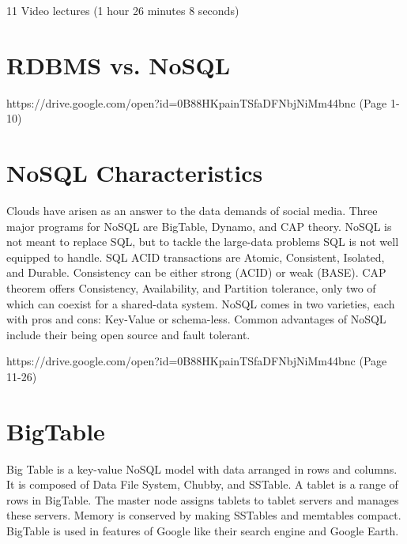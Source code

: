 
  11 Video lectures (1 hour 26 minutes 8 seconds)

\section{RDBMS vs. NoSQL}


{https://drive.google.com/open?id=0B88HKpainTSfaDFNbjNiMm44bnc
  (Page 1-10)}

\section{NoSQL Characteristics}

Clouds have arisen as an answer to the data demands of social media.
Three major programs for NoSQL are BigTable, Dynamo, and CAP theory.
NoSQL is not meant to replace SQL, but to tackle the large-data problems
SQL is not well equipped to handle. SQL ACID transactions are Atomic,
Consistent, Isolated, and Durable. Consistency can be either strong
(ACID) or weak (BASE). CAP theorem offers Consistency, Availability, and
Partition tolerance, only two of which can coexist for a shared-data
system. NoSQL comes in two varieties, each with pros and cons: Key-Value
or schema-less. Common advantages of NoSQL include their being open
source and fault tolerant.


{https://drive.google.com/open?id=0B88HKpainTSfaDFNbjNiMm44bnc
  (Page 11-26)}

\section{BigTable}

Big Table is a key-value NoSQL model with data arranged in rows and
columns. It is composed of Data File System, Chubby, and SSTable. A
tablet is a range of rows in BigTable. The master node assigns tablets
to tablet servers and manages these servers. Memory is conserved by
making SSTables and memtables compact. BigTable is used in features of
Google like their search engine and Google Earth.


